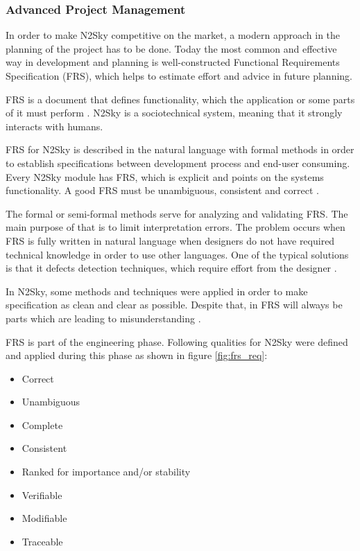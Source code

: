 \subsubsection{Advanced Project Management}\label{Advanced project management}

In order to make N2Sky competitive on the market, a modern approach in the planning of the project has to be done. Today the most common and effective way in development and planning is well-constructed Functional Requirements Specification (FRS), which helps to estimate effort and advice in future planning. 

FRS is a document that defines functionality, which the application or some parts of it must perform \cite{wiki:frs}. N2Sky is a sociotechnical system, meaning that it strongly interacts with humans. 

FRS for N2Sky is described in the natural language with formal methods in order to establish specifications between development process and end-user consuming. Every N2Sky module has FRS, which is explicit and points on the systems functionality. A good FRS must be unambiguous, consistent and correct \cite{frs_1}.  
 
The formal or semi-formal methods serve for analyzing and validating FRS. The main purpose of that is to limit interpretation errors. The problem occurs when FRS is fully written in natural language when designers do not have required technical knowledge in order to use other languages. One of the typical solutions is that it defects detection techniques, which require effort from the designer \cite{frs_3}. 
 
In N2Sky, some methods and techniques were applied in order to make specification as clean and clear as possible. Despite that, in FRS will always be parts which are leading to misunderstanding \cite{frs_1}.
  
FRS is part of the engineering phase. Following qualities for N2Sky were defined and applied during this phase \cite{frs_4} as shown in figure \ref{fig:frs_req}:
\begin{itemize}
\item Correct
\item Unambiguous
\item Complete
\item Consistent
\item Ranked for importance and/or stability
\item Verifiable
\item Modifiable
\item Traceable 
\end{itemize}



